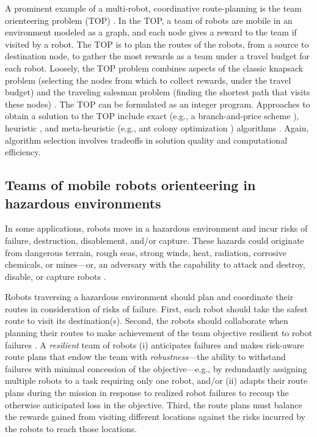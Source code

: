 \documentclass[fleqn,10pt,lineno]{wlpeerj}
\begin{document}
A prominent example of a multi-robot, coordinative route-planning is the team orienteering \cite{golden1987orienteering} problem (TOP) \cite{chao1996team,gunawan2016orienteering,vansteenwegen2011orienteering}.
In the TOP, a team of robots are mobile in an environment modeled as a graph, and each node gives a reward to the team if visited by a robot.
The TOP is to plan the routes of the robots, from a source to destination node, to gather the most rewards as a team under a travel budget for each robot. 
Loosely, the TOP problem combines aspects of the classic knapsack problem (selecting the nodes from which to collect rewards, under the travel budget) and the traveling salesman problem (finding the shortest path that visits these nodes) \cite{vansteenwegen2011orienteering}.
The TOP can be formulated as an integer program.
Approaches to obtain a solution to the TOP include exact (e.g., a branch-and-price scheme \cite{boussier2007exact}), heuristic \cite{chao1996team}, and meta-heuristic (e.g., ant colony optimization \cite{ke2008ants}) algorithms \cite{vansteenwegen2011orienteering}. Again, algorithm selection involves tradeoffs in solution quality and computational efficiency. 

\subsection{Teams of mobile robots orienteering in hazardous environments} 
In some applications, robots move in a hazardous environment \cite{trevelyan2016robotics,trevelyan2016robotics} and incur risks of failure, destruction, disablement, and/or capture. 
These hazards could originate from dangerous terrain, rough seas, strong winds, heat, radiation, corrosive chemicals, or mines---or, an adversary with the capability to attack and destroy, disable, or capture robots \cite{agmon2017robotic}. 

Robots traversing a hazardous environment should plan and coordinate their routes in consideration of risks of failure.
First, each robot should take the safest route to visit its destination(s). 
Second, the robots should collaborate when planning their routes to make achievement of the team objective resilient to robot failures \cite{zhou2021multi}. 
A \emph{resilient} team of robots \cite{prorok2021beyond}
(i) anticipates failures and makes risk-aware route plans that endow the team with \emph{robustness}---the ability to withstand failures with minimal concession of the objective---e.g., by redundantly assigning multiple robots to a task requiring only one robot,
and/or
(ii) adapts their route plans during the mission in response to realized robot failures to recoup the otherwise anticipated loss in the objective. 
Third, the route plans must balance the rewards gained from visiting different locations against the risks incurred by the robots to reach those locations.
\end{document}
